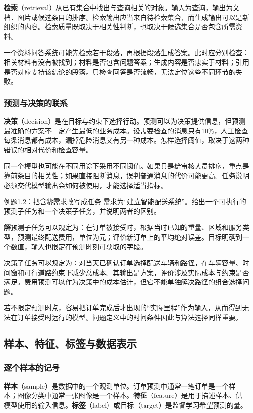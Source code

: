 \documentclass[UTF8,fontset=none,zihao=-4,a4paper]{ctexart}
\newcommand{\term}[1]{\textbf{#1}}
\newcommand{\sol}{\par\noindent\textbf{解}\quad}
\numberwithin{equation}{section}
\numberwithin{figure}{section}
\begin{document}
\term{检索}（retrieval）从已有集合中找出与查询相关的对象。输入为查询，输出为文档、图片或候选条目的排序。检索输出应当来自待检索集合，而生成输出可以是新组织的内容。检索质量既取决于相关性判断，也取决于候选集合是否包含所需资料。

一个资料问答系统可能先检索若干段落，再根据段落生成答案。此时应分别检查：相关材料有没有被找到；材料是否包含问题答案；生成内容是否忠实于材料；引用是否对应支持该结论的段落。只检查回答是否流畅，无法定位这些不同环节的失败。

\subsubsection{预测与决策的联系}
\term{决策}（decision）是在目标与约束下选择行动。预测可以为决策提供信息，但预测最准确的方案不一定产生最低的业务成本。设需要检查的消息只有10\%，人工检查每条消息都有成本，漏掉危险消息又有另一种成本。怎样选择阈值，取决于这两种错误的相对代价和检查容量。

同一个模型也可能在不同用途下采用不同阈值。如果只是给审核人员排序，重点是靠前条目的相关性；如果直接阻断消息，误判普通消息的代价可能更高。任务说明必须交代模型输出会如何被使用，才能选择适当指标。

\begin{infobox}{例题1.2：把含糊需求改写成任务}
需求为“建立智能配送系统”。给出一个可执行的预测子任务和一个决策子任务，并说明两者的区别。
\end{infobox}
\sol 预测子任务可以规定为：在订单被接受时，根据当时已知的重量、区域和服务类型，预测最终配送费用，单位为元；评价新订单上的平均绝对误差。目标明确到一个数值，输入也限定在预测时刻可获取的字段。

决策子任务可以规定为：对当天已确认订单选择配送车辆和路径，在车辆容量、时间窗和可行道路约束下减少总成本。其输出是方案，评价涉及实际成本与约束是否满足。费用预测可以作为决策中的成本估计，但它不能单独解决路径的组合选择问题。

若不限定预测时点，容易把订单完成后才出现的“实际里程”作为输入，从而得到无法在订单接受时运行的模型。问题定义中的时间条件因此与算法选择同样重要。

\subsection{样本、特征、标签与数据表示}
\subsubsection{逐个样本的记号}
\term{样本}（sample）是数据中的一个观测单位。订单预测中通常一笔订单是一个样本；图像分类中通常一张图像是一个样本。\term{特征}（feature）是用于描述样本、供模型使用的输入信息。\term{标签}（label）或目标（target）是监督学习希望预测的量。
\end{document}
